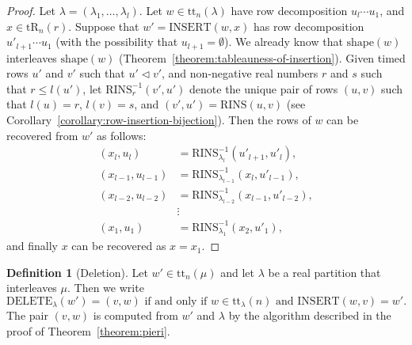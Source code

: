 \documentclass[10pt]{amsproc}
\theoremstyle{definition}
\newtheorem{definition}[theorem]{Definition}
\theoremstyle{remark}
\newcommand{\rowins}{\mathrm{RINS}}
\newcommand{\ins}{\mathrm{INSERT}}
\newcommand{\del}{\mathrm{DELETE}}
\newcommand{\shape}{\mathrm{shape}}
\newcommand{\ttab}{\mathrm{tt}}
\newcommand{\tr}{\mathrm{tR}}
\begin{document}
\begin{proof}
  Let $\lambda=(\lambda_1,\dotsc,\lambda_l)$.
  Let $w\in \ttab_n(\lambda)$ have row decomposition $u_l\dotsb u_1$, and $x\in \tr_n(r)$.
  Suppose that $w'=\ins(w,x)$ has row decomposition $u'_{l+1}\dotsb u_1$ (with the possibility that $u_{l+1}=\emptyset$).
  We already know that $\shape(w)$ interleaves $\shape(w)$ (Theorem~\ref{theorem:tableauness-of-insertion}).
  Given timed rows $u'$ and $v'$ such that $u'\lhd v'$, and non-negative real numbers $r$ and $s$ such that $r\leq l(u')$, let $\rowins^{-1}_r(v',u')$ denote the unique pair of rows $(u,v)$ such that $l(u)=r$, $l(v)=s$, and $(v',u')=\rowins(u,v)$ (see Corollary~\ref{corollary:row-insertion-bijection}).
  Then the rows of $w$ can be recovered from $w'$ as follows:
  \begin{align*}
    (x_l, u_l) & = \rowins^{-1}_{\lambda_l}(u'_{l+1},u'_l),\\
    (x_{l-1},u_{l-1}) & = \rowins^{-1}_{\lambda_{l-1}}(x_l,u'_{l-1}),\\
    (x_{l-2},u_{l-2}) & = \rowins^{-1}_{\lambda_{l-2}}(x_{l-1},u'_{l-2}),\\
    &\vdots\\
    (x_1,u_1) & = \rowins^{-1}_{\lambda_1}(x_2,u'_1),
  \end{align*}
  and finally $x$ can be recovered as $x=x_1$.
\end{proof}
\begin{definition}
  [Deletion]
  \label{definition:deletion}
  Let $w'\in \ttab_n(\mu)$ and let $\lambda$ be a real partition that interleaves $\mu$.
  Then we write
  \begin{displaymath}
    \del_\lambda(w')=(v,w) \text{ if and only if } w\in \ttab_\lambda(n) \text{ and }\ins(w,v)=w'.
  \end{displaymath}
  The pair $(v,w)$ is computed from $w'$ and $\lambda$ by the algorithm described in the proof of Theorem~\ref{theorem:pieri}.
\end{definition}
\end{document}
